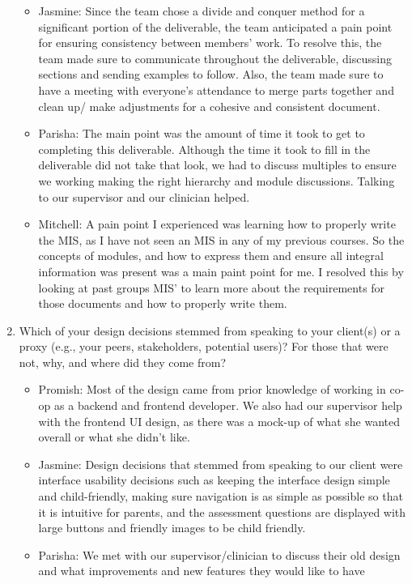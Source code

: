 \documentclass[12pt, titlepage]{article}
\begin{document}
\begin{enumerate}
\begin{itemize}
      \item Jasmine: Since the team chose a divide and conquer method for a significant portion of the deliverable, the team anticipated
      a pain point for ensuring consistency between members' work. To resolve this, the team made sure to communicate throughout the
      deliverable, discussing sections and sending examples to follow. Also, the team made sure to have a meeting with everyone's
      attendance to merge parts together and clean up/ make adjustments for a cohesive and consistent document.
      \item Parisha: The main point was the amount of time it took to get to completing this deliverable. Although the time it took to
      fill in the deliverable did not take that look, we had to discuss multiples to ensure we working making the right hierarchy and
      module discussions. Talking to our supervisor and our clinician helped.
      \item Mitchell: A pain point I experienced was learning how to properly write the MIS, as I have not seen an MIS in any of my previous
      courses. So the concepts of modules, and how to express them and ensure all integral information was present was a main paint point for me.
      I resolved this by looking at past groups MIS' to learn more about the requirements for those documents and how to properly write them.
    \end{itemize}
  \item Which of your design decisions stemmed from speaking to your client(s)
  or a proxy (e.g., your peers, stakeholders, potential users)? For those that
  were not, why, and where did they come from?
  \begin{itemize}
    \item Promish: Most of the design came from prior knowledge of working in co-op as a backend and frontend developer.
    We also had our supervisor help with the frontend UI design, as there was a mock-up of what she wanted overall or what she didn't like.
    \item Jasmine: Design decisions that stemmed from speaking to our client were interface usability decisions such as keeping the interface
    design simple and child-friendly, making sure navigation is as simple as possible so that it is intuitive for parents, and the
    assessment questions are displayed with large buttons and friendly images to be child friendly.
    \item Parisha: We met with our supervisor/clinician to discuss their old design and what improvements and new features they would like to have

\end{itemize}
\end{enumerate}
\end{document}
